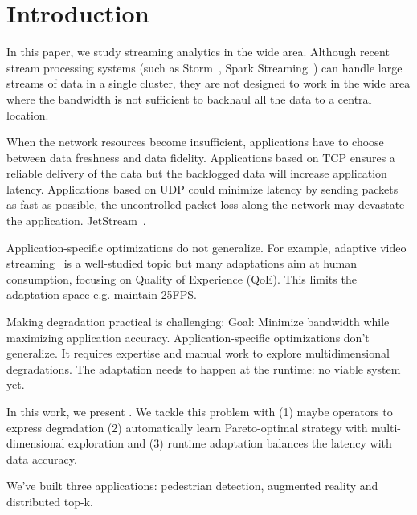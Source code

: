 \section{Introduction}

In this paper, we study streaming analytics in the wide area. Although recent
stream processing systems (such as Storm~\cite{toshniwal2014storm}, Spark
Streaming~\cite{zaharia2013discretized}) can handle large streams of data in a
single cluster, they are not designed to work in the wide area where the
bandwidth is not sufficient to backhaul all the data to a central location.


When the network resources become insufficient, applications have to choose
between data freshness and data fidelity. Applications based on TCP ensures a
reliable delivery of the data but the backlogged data will increase application
latency. Applications based on UDP could minimize latency by sending packets as
fast as possible, the uncontrolled packet loss along the network may devastate
the application. JetStream~\cite{rabkin2014aggregation}.

Application-specific optimizations do not generalize. For example, adaptive
video streaming~\cite{yin2015control} is a well-studied topic but many
adaptations aim at human consumption, focusing on Quality of Experience
(QoE). This limits the adaptation space e.g. maintain 25FPS.

Making degradation practical is challenging: Goal: Minimize bandwidth while
maximizing application accuracy. Application-specific optimizations don't
generalize. It requires expertise and manual work to explore multidimensional
degradations. The adaptation needs to happen at the runtime: no viable system
yet.

In this work, we present \sysname{}. We tackle this problem with (1) maybe
operators to express degradation (2) automatically learn Pareto-optimal strategy
with multi-dimensional exploration and (3) runtime adaptation balances the
latency with data accuracy.

We've built three applications: pedestrian detection, augmented reality and
distributed top-k.

